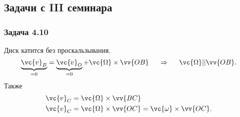 \subsection{Задачи с III семинара}
\subsubsection*{\xmark Задача 4.10}



Диск катится без проскальзывания. 
$$
    \underbrace{\vc{v}_B}_{=0} = \underbrace{\vc{v}_O}_{=0} + \vc{\Omega} \times \vv{OB}
    \hspace{0.5cm}\Rightarrow \hspace{0.5cm}\vc{\Omega} || \vv{OB}.
$$
Также
\begin{align*}
    \vc{v}_C &= \vc{\Omega} \times \vv{BC} \\
    \vc{v}_C &= \vc{\Omega} \times \vv{OC} = \vc{\omega} \times \vv{OC}.  
\end{align*}


